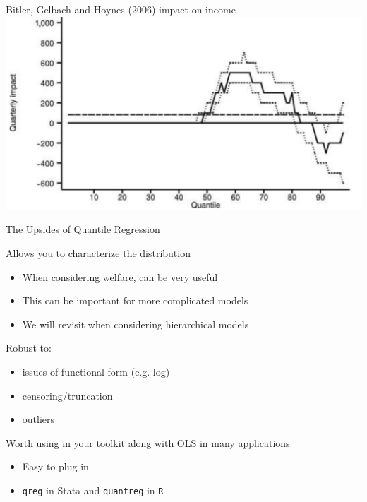 \documentclass[notes,11pt, aspectratio=169]{beamer}
\newenvironment{wideitemize}{\itemize\addtolength{\itemsep}{10pt}}{\enditemize}
\begin{document}
\begin{frame}{Bitler, Gelbach and Hoynes (2006) impact on income }
    \includegraphics[width=\textwidth]{bitler_QTE.png}
\end{frame}


\begin{frame}{The Upsides of Quantile Regression}
  \begin{wideitemize}
  \item Allows you to characterize the distribution
    \begin{itemize}
    \item  When considering welfare, can be very useful
    \item This can be important for more complicated models
    \item We will revisit when considering hierarchical models
    \end{itemize}
  \item Robust to:
    \begin{itemize}
    \item issues of functional form (e.g. log)
    \item censoring/truncation
    \item outliers
    \end{itemize}
  \item Worth using in your toolkit along with OLS in many applications
    \begin{itemize}
    \item Easy to plug in
    \item \texttt{qreg} in Stata and \texttt{quantreg} in \texttt{R}
    \end{itemize}
  \end{wideitemize}
\end{frame}
\end{document}
